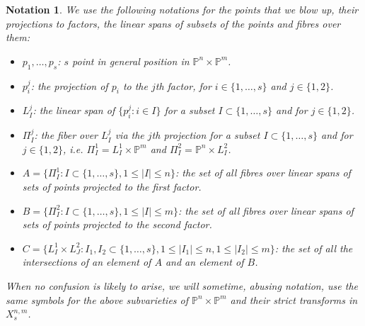 \documentclass[a4paper,11pt]{article}
\newtheorem{notation}[theorem]{Notation}
\newcommand{\PP}{\mathbb P}
\begin{document}
\begin{notation}\label{notation:fibres}
We use the following notations for the points that we blow up, their projections to factors, the linear spans of subsets of the points and fibres over them:
\begin{itemize}
\item $p_1,\dots,p_s$: $s$ point in general position in $\PP^n\times\PP^m$.
\item $p^j_i$: the projection of $p_i$ to the $j$th factor, for $i\in\{1,\dots,s\}$ and $j\in\{1,2\}$.
\item $L^j_I$: the linear span of $\{p^j_i:i\in I\}$ for 
a subset $I\subset\{1,\dots,s\}$ and for $j\in\{1,2\}$.
\item $\Pi^j_I$: the fiber over $L^j_I$ via the $j$th projection for 
a subset $I\subset\{1,\dots,s\}$ and for $j\in\{1,2\}$, i.e. $\Pi^1_I=L^1_I\times\PP^m$ and $\Pi^2_I=\PP^n\times L^2_I$.
\item  $A=\{\Pi^1_I: I\subset\{1,\dots,s\},1\le |I|\le n\}$: the set of all fibres over linear spans of sets of points projected to the first factor.
\item $B=\{\Pi^2_I: I\subset\{1,\dots,s\},1\le |I|\le m\}$: the set of all fibres over linear spans of sets of points projected to the second factor.
\item $C=\{L^1_I\times L^2_J: I_1,I_2\subset\{1,\dots,s\},1\le |I_1|\le n,  1\le |I_2|\le m\}$: the set of all the intersections of an element of $A$ and an element of $B$.
\end{itemize}
When no confusion is likely to arise, we will sometime,  abusing notation, use the same symbols for the above subvarieties of $\PP^n\times\PP^m$ and their strict transforms in $X^{n,m}_s$.
\end{notation}
\end{document}
